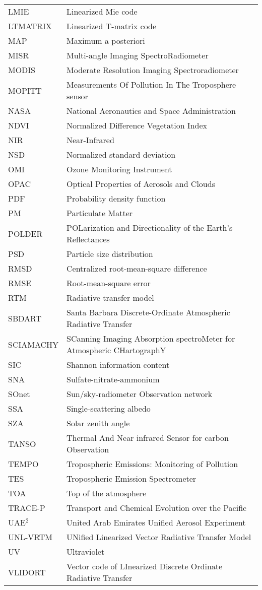 \begin{center}
\begin{small}
\begin{longtable}{p{6em} p{30em} }
LMIE & Linearized Mie code \\
LTMATRIX & Linearized T-matrix code \\
MAP & Maximum a posteriori  \\
MISR & Multi-angle Imaging SpectroRadiometer \\
MODIS &Moderate Resolution Imaging Spectroradiometer \\
MOPITT &Measurements Of Pollution In The Troposphere sensor \\
NASA & National Aeronautics and Space Administration  \\
NDVI & Normalized Difference Vegetation Index \\
NIR & Near-Infrared \\
NSD & Normalized standard deviation \\
OMI & Ozone Monitoring Instrument \\
OPAC & Optical Properties of Aerosols and Clouds \\
PDF & Probability density function \\
PM & Particulate Matter \\
POLDER & POLarization and Directionality of the Earth’s Reflectances \\
PSD & Particle size distribution \\
RMSD & Centralized root-mean-square difference \\
RMSE & Root-mean-square error \\
RTM & Radiative transfer model \\
SBDART & Santa Barbara Discrete-Ordinate Atmospheric Radiative Transfer \\
SCIAMACHY & SCanning Imaging Absorption spectroMeter for Atmospheric CHartographY \\
SIC & Shannon information content \\
SNA & Sulfate-nitrate-ammonium \\
SOnet & Sun/sky-radiometer Observation network \\
SSA & Single-scattering albedo \\
SZA & Solar zenith angle \\
TANSO & Thermal And Near infrared Sensor for carbon Observation \\
TEMPO & Tropospheric Emissions: Monitoring of Pollution \\
TES & Tropospheric Emission Spectrometer \\
TOA & Top of the atmosphere \\
TRACE-P & Transport and Chemical Evolution over the Pacific \\
UAE$^2$ & United Arab Emirates Unified Aerosol Experiment \\
UNL-VRTM & UNified Linearized Vector Radiative Transfer Model \\
UV & Ultraviolet \\
VLIDORT & Vector code of LInearized Discrete Ordinate Radiative Transfer \\
\end{longtable}
\end{small}
\end{center}
\endgroup
